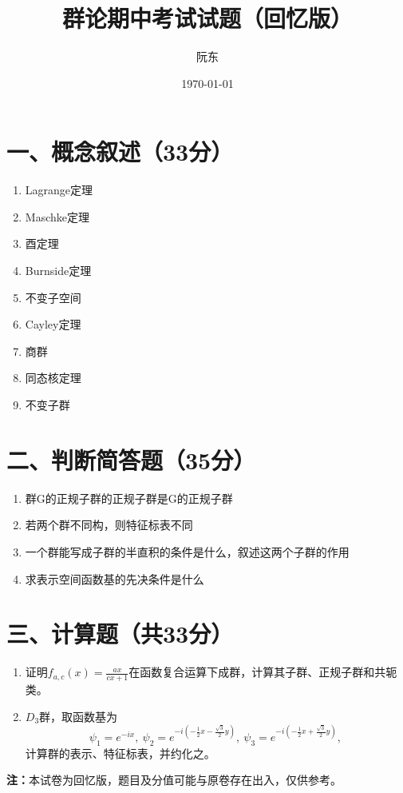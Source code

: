 \documentclass[12pt,a4paper]{ctexart}
\title{\textbf{群论期中考试试题（回忆版）}}
\author{阮东}
\date{\today}
\begin{document}
\maketitle

\section*{一、概念叙述（33分）}
\begin{enumerate}[label={\arabic*.}]
    \item Lagrange定理
    \item Maschke定理
    \item 酉定理
    \item Burnside定理
    \item 不变子空间
    \item Cayley定理
    \item 商群
    \item 同态核定理
    \item 不变子群
\end{enumerate}

\section*{二、判断简答题（35分）}
\begin{enumerate}[label={\arabic*.}]
    \item 群G的正规子群的正规子群是G的正规子群
    \item 若两个群不同构，则特征标表不同
    \item 一个群能写成子群的半直积的条件是什么，叙述这两个子群的作用
    \item 求表示空间函数基的先决条件是什么
\end{enumerate}

\section*{三、计算题（共33分）}
\begin{enumerate}[label={\arabic*.}]
    \item 证明$f_{a,c}(x) = \frac{ax}{cx+1}$在函数复合运算下成群，计算其子群、正规子群和共轭类。

    \item $D_3$群，取函数基为
    $$\psi_1 = e^{-ix},\ \psi_2 = e^{-i(-\frac{1}{2}x-\frac{\sqrt{3}}{2}y)},\ \psi_3 = e^{-i(-\frac{1}{2}x+\frac{\sqrt{3}}{2}y)},\ $$
    计算群的表示、特征标表，并约化之。
\end{enumerate}
\vfill
\noindent\textbf{注：}本试卷为回忆版，题目及分值可能与原卷存在出入，仅供参考。
\end{document}
